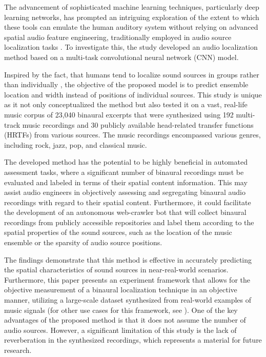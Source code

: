 \documentclass{article}
\begin{document}
The advancement of sophisticated machine learning techniques, particularly deep learning networks, has prompted an intriguing exploration of the extent to which these tools can emulate the human auditory system without relying on advanced spatial audio feature engineering, traditionally employed in audio source localization tasks \cite{yang_deepear_2022, vera-diaz_towards_2018, pang_multitask_2019}. To investigate this, the study developed an audio localization method based on a multi-task convolutional neural network (CNN) model.

Inspired by the fact, that humans tend to localize sound sources in groups rather than individually \cite{bregman_auditory_1990, rumsey_spatial_2002}, the objective of the proposed model is to predict ensemble location and width instead of positions of individual sources. This study is unique as it not only conceptualized the method but also tested it on a vast, real-life music corpus of 23,040 binaural excerpts that were synthesized using 192 multi-track music recordings and 30 publicly available head-related transfer functions (HRTFs) from various sources. The music recordings encompassed various genres, including rock, jazz, pop, and classical music.

The developed method has the potential to be highly beneficial in automated assessment tasks, where a significant number of binaural recordings must be evaluated and labeled in terms of their spatial content information. This may assist audio engineers in objectively assessing and segregating binaural audio recordings with regard to their spatial content. Furthermore, it could facilitate the development of an autonomous web-crawler bot that will collect binaural recordings from publicly accessible repositories and label them according to the spatial properties of the sound sources, such as the location of the music ensemble or the sparsity of audio source positions.

The findings demonstrate that this method is effective in accurately predicting the spatial characteristics of sound sources in near-real-world scenarios. Furthermore, this paper presents an experiment framework that allows for the objective measurement of a binaural localization technique in an objective manner, utilizing a large-scale dataset synthesized from real-world examples of music signals (for other use cases for this framework, see \cite{antoniuk2023blind, zielinski_automatic_2022, zielinski_spatial_2022, zielinski_comparison_2020}). One of the key advantages of the proposed method is that it does not assume the number of audio sources. However, a significant limitation of this study is the lack of reverberation in the synthesized recordings, which represents a material for future research.
\end{document}
